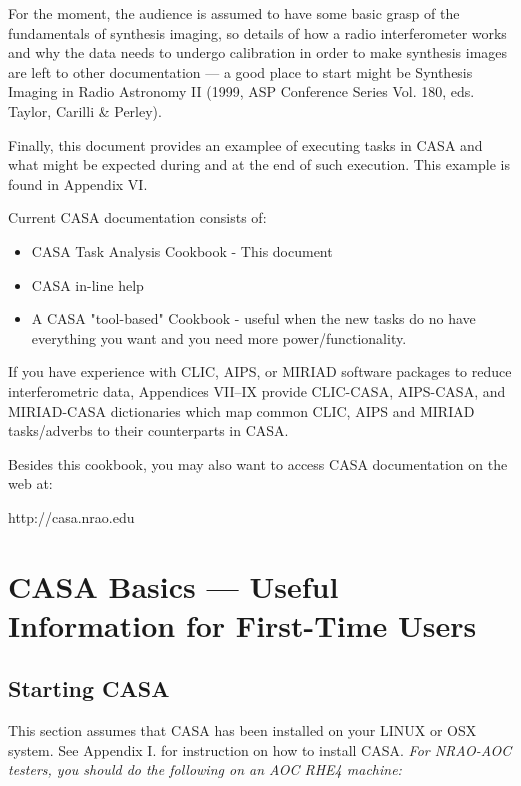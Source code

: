 For the moment, the audience is assumed to have some basic grasp of
the fundamentals of synthesis imaging, so details of how a radio
interferometer works and why the data needs to undergo calibration in
order to make synthesis images are left to other documentation --- a
good place to start might be Synthesis Imaging in Radio Astronomy II
(1999, ASP Conference Series Vol. 180, eds. Taylor, Carilli \& Perley).

Finally, this document provides an examplee of executing tasks in CASA
and what might be expected during and at the end of such execution.
This example is found in Appendix VI.

Current CASA documentation consists of:
\begin{itemize}
   \item CASA Task Analysis Cookbook - This document
   \item CASA in-line help
   \item A CASA "tool-based" Cookbook - useful when the new tasks do no
         have everything you want and you need more power/functionality.   
\end{itemize}

If you have experience with CLIC, AIPS, or MIRIAD software packages to
reduce interferometric data, Appendices VII--IX provide CLIC-CASA,
AIPS-CASA, and MIRIAD-CASA dictionaries which map common CLIC,
AIPS and MIRIAD tasks/adverbs to their counterparts in CASA.

Besides this cookbook, you may also want to access
CASA documentation on the web at:

http://casa.nrao.edu

\section{CASA Basics --- Useful Information for First-Time Users}
\label{section:basics}

\subsection{Starting CASA}
\label{subsection:starting}

This section assumes that CASA has been installed on your LINUX or OSX
system.  See Appendix I. for instruction on how to install CASA.  {\it
For NRAO-AOC testers, you should do the following on an AOC RHE4
machine:}

